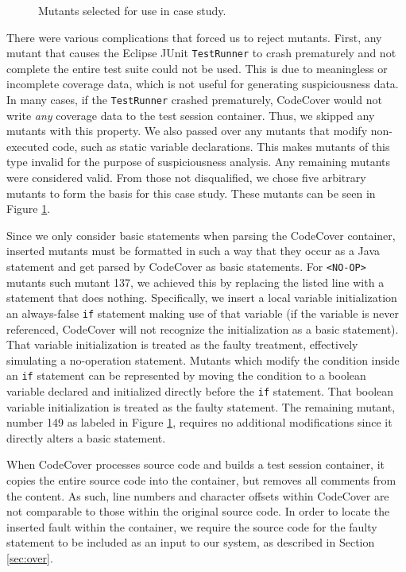 \begin{figure}[tb]

\caption{Mutants selected for use in case study.}
\label{fig:mutants}
\end{figure}

There were various complications that forced us to reject mutants.  First, any mutant that
causes the Eclipse JUnit \texttt{TestRunner} to crash prematurely and not complete the entire test 
suite could not be used.  This is due to meaningless or incomplete coverage data, which is not useful
for generating suspiciousness data.  In many cases, if the \texttt{TestRunner} crashed prematurely,
CodeCover would not write \emph{any} coverage data to the test session container.  Thus, we skipped
any mutants with this property. We also passed over any mutants that modify non-executed code, such
as static variable declarations.  
This makes mutants of this type invalid for the purpose of suspiciousness analysis.  Any remaining
mutants were considered valid.  From those not disqualified, we chose five arbitrary mutants to 
form the basis for this case study.   These mutants can be seen in Figure \ref{fig:mutants}.

Since we only consider basic statements when parsing the CodeCover container, inserted mutants
must be formatted in such a way that they occur as a Java statement and get parsed by CodeCover
as basic statements.  For \texttt{<NO-OP>} mutants such mutant 137, we achieved this by replacing
the listed line with a statement that does nothing.  Specifically, we insert a local variable 
initialization an always-false \texttt{if} statement making use of that variable (if the variable
is never referenced, CodeCover will not recognize the initialization as a basic statement).  That 
variable initialization is treated as the faulty treatment, effectively simulating a no-operation
statement.  Mutants which modify the condition inside an \texttt{if} statement can be represented by 
moving the condition to a boolean variable declared and initialized directly before the \texttt{if}
statement.  That boolean variable initialization is treated as the faulty statement.  The remaining
mutant, number 149 as labeled in Figure \ref{fig:mutants}, requires no additional modifications since
it directly alters a basic statement.

When CodeCover processes source code and builds a test session container, it copies the entire source
code into the container, but removes all comments from the content.  As such, line numbers and character
offsets within CodeCover are not comparable to those within the original source code.  In
order to locate the inserted fault within the container, we require the source code for the faulty
statement to be included as an input to our system, as described in Section \ref{sec:over}.

